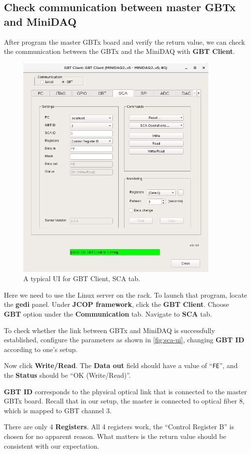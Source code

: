 \subsection{Check communication between master GBTx and MiniDAQ}
After program the master GBTx board and verify the return value, we can check
the communication between the GBTx and the MiniDAQ with \textbf{GBT Client}.

\begin{figure}[ht]
    \centering
    \includegraphics[width=0.9\textwidth]{res/gbt_client_master_gbt_sca_test.png}
    \caption{A typical UI for GBT Client, SCA tab.}
    \label{fig:sca-ui}
\end{figure}

Here we need to use the Linux server on the rack.
To launch that program, locate the \textbf{gedi} panel. Under
\textbf{JCOP framework},
click the \textbf{GBT Client}.
Choose \textbf{GBT} option under the \textbf{Communication} tab.
Navigate to \textbf{SCA} tab.

To check whether the link between GBTx and MiniDAQ is successfully established,
configure the parameters as shown in \autoref{fig:sca-ui},
changing \textbf{GBT ID} according to one's setup.

Now click \textbf{Write/Read}.
The \textbf{Data out} field should have a value of ``\texttt{FE}'', and the
\textbf{Status} should be ``OK (Write/Read)''.

\begin{leftbar}
    \textbf{GBT ID} corresponds to the physical optical link that is connected
    to the master GBTx board.
    Recall that in our setup, the master is connected to optical fiber 8, which
    is mapped to GBT channel 3.
\end{leftbar}

\begin{leftbar}
    There are only 4 \textbf{Registers}.
    All 4 registers work, the ``Control Register B'' is chosen for no apparent
    reason.
    What matters is the return value should be consistent with our expectation.
\end{leftbar}
